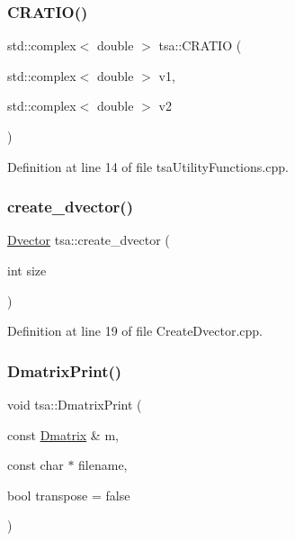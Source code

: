 \subsubsection{\texorpdfstring{C\+R\+A\+T\+I\+O()}{CRATIO()}}
{\footnotesize\ttfamily std\+::complex$<$ double $>$ tsa\+::\+C\+R\+A\+T\+IO (\begin{DoxyParamCaption}\item[{std\+::complex$<$ double $>$}]{v1,  }\item[{std\+::complex$<$ double $>$}]{v2 }\end{DoxyParamCaption})}



Definition at line 14 of file tsa\+Utility\+Functions.\+cpp.

\mbox{\label{namespacetsa_a1f1681e991b47cfe3bc50282c96bd744}} 
\subsubsection{\texorpdfstring{create\+\_\+dvector()}{create\_dvector()}}
{\footnotesize\ttfamily \hyperlink{namespacetsa_a8900fb03d849baf447a1a0efe2561fb2}{Dvector} tsa\+::create\+\_\+dvector (\begin{DoxyParamCaption}\item[{int}]{size }\end{DoxyParamCaption})}



Definition at line 19 of file Create\+Dvector.\+cpp.

\mbox{\label{namespacetsa_ae15dd89a370a611b23e85adea9ed416d}} 
\subsubsection{\texorpdfstring{Dmatrix\+Print()}{DmatrixPrint()}}
{\footnotesize\ttfamily void tsa\+::\+Dmatrix\+Print (\begin{DoxyParamCaption}\item[{const \hyperlink{namespacetsa_ad260cd21c1891c4ed391fe788569aba4}{Dmatrix} \&}]{m,  }\item[{const char $\ast$}]{filename,  }\item[{bool}]{transpose = {\ttfamily false} }\end{DoxyParamCaption})}



